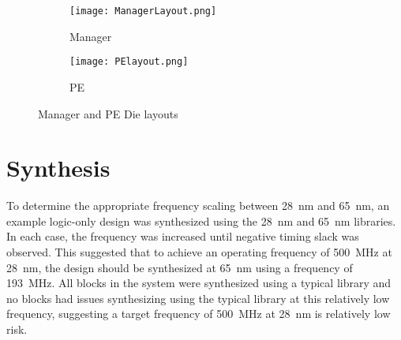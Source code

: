 \begin{figure}[h]
\centering
\begin{subfigure}{.5\textwidth}
  \centering
  \centerline{
    \mbox{\texttt{[image: ManagerLayout.png]}}
  }
  \captionsetup{justification=centering, width=.8\linewidth}
  \caption{Manager}
  \label{fig:managerLayout}
\end{subfigure}%

\bigskip

\begin{subfigure}{.5\textwidth}
  \centering
  \centerline{
    \mbox{\texttt{[image: PElayout.png]}}
  }
  \captionsetup{justification=centering, width=.8\linewidth}
  \caption{PE}
  \label{fig:peLayout}
\end{subfigure}
\captionsetup{justification=centering, width=.9\linewidth}
\caption{Manager and PE Die layouts}
\label{fig:Manager and PE Die layouts}
\end{figure}



\section{Synthesis}
\label{sec:Synthesis}

To determine the appropriate frequency scaling between \SI{28}{\nano\meter} and \SI{65}{\nano\meter}, an example logic-only design was synthesized using the \SI{28}{\nano\meter} and \SI{65}{\nano\meter} libraries. 
In each case, the frequency was increased until negative timing slack was observed.
This suggested that to achieve an operating frequency of \SI{500}{\mega\hertz} at \SI{28}{\nano\meter}, the design should be synthesized at \SI{65}{\nano\meter} using a frequency of \SI{193}{\mega\hertz}.
All blocks in the system were synthesized using a typical library and no blocks had issues synthesizing using the typical library at this relatively low frequency, suggesting a target frequency of \SI{500}{\mega\hertz} at \SI{28}{\nano\meter} is relatively low risk.


\iffalse
As mentioned previously \eqref{eq:averageBandwidth}, to process multiple useful-sized \acp{ann} requires a sustained bandwidth to the \ac{pe} of the order of tens of \SI[per-mode=symbol]{}{\tera\bit\per\second}.
\fi

